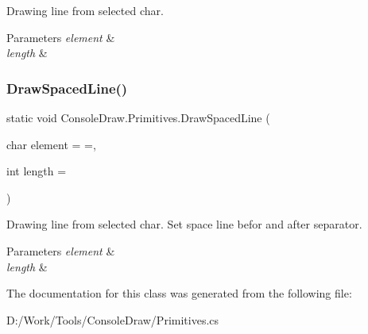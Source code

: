 Drawing line from selected char. 


\begin{DoxyParams}{Parameters}
{\em element} & \\
\hline
{\em length} & \\
\hline
\end{DoxyParams}
\mbox{\label{class_console_draw_1_1_primitives_a56f4fc0b28e3e0182208dccaf6944fdb}} 
\subsubsection{\texorpdfstring{Draw\+Spaced\+Line()}{DrawSpacedLine()}}
{\footnotesize\ttfamily static void Console\+Draw.\+Primitives.\+Draw\+Spaced\+Line (\begin{DoxyParamCaption}\item[{char}]{element = {\ttfamily \textquotesingle{}=\textquotesingle{}},  }\item[{int}]{length = {} }\end{DoxyParamCaption})\hspace{0.3cm}{\ttfamily [static]}}



Drawing line from selected char. Set space line befor and after separator. 


\begin{DoxyParams}{Parameters}
{\em element} & \\
\hline
{\em length} & \\
\hline
\end{DoxyParams}


The documentation for this class was generated from the following file\+:\begin{DoxyCompactItemize}
\item 
D\+:/\+Work/\+Tools/\+Console\+Draw/Primitives.\+cs\end{DoxyCompactItemize}
